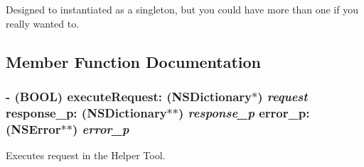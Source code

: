 Designed to instantiated as a singleton, but you could have more than one if you really wanted to. 

\subsection{Member Function Documentation}
\hypertarget{class_s_s_y_authorized_task_master_1dc3930fb2b15f7945f8d129c055d9fa}{
\subsubsection[{executeRequest:response\_\-p:error\_\-p:}]{\setlength{\rightskip}{0pt plus 5cm}- (BOOL) executeRequest: (NSDictionary$\ast$) {\em request}\/ response_p: (NSDictionary$\ast$$\ast$) {\em response\_\-p}\/ error_p: (NSError$\ast$$\ast$) {\em error\_\-p}}}
\label{class_s_s_y_authorized_task_master_1dc3930fb2b15f7945f8d129c055d9fa}


Executes request in the Helper Tool. 

